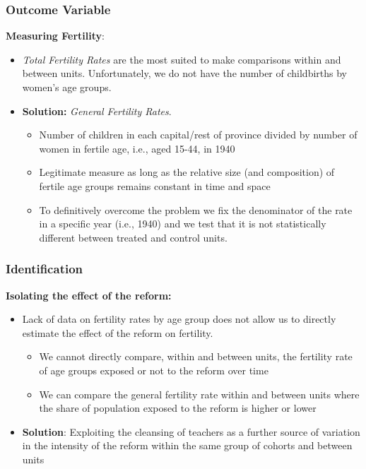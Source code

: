 \documentclass[aspectratio=169]{beamer}
\begin{document}
 





\begin{frame}[label=empirical]
\frametitle{Outcome Variable}

\textbf{Measuring Fertility}:
\medskip
\begin{itemize}
    \item \textit{Total Fertility Rates} are the most suited to make comparisons within and between units. Unfortunately, we do not have the number of childbirths by women's age groups. 
    \medskip\pause
    \item \textbf{Solution:} \textit{General Fertility Rates}. 
    \begin{itemize}

\medskip 
    \item Number of children in each capital/rest of province divided by number of women in fertile age, i.e., aged 15-44, in 1940 
    \medskip\pause
    \item Legitimate measure as long as the relative size (and composition) of fertile age groups remains constant in time and space \hyperlink{stability_age}{}
    \medskip\pause
    \item To definitively overcome the problem we fix the denominator of the rate in a specific year (i.e., 1940) and we test that it is not statistically different between treated and control units.
    \end{itemize}

    \medskip
    
\end{itemize}

\end{frame}

\begin{frame}[label=empirical2]
\frametitle{Identification}


\textbf{Isolating the effect of the reform:}
\medskip
\begin{itemize}
\item Lack of data on fertility rates by age group does not allow us to directly estimate the effect of the reform on fertility. 
\begin{itemize}
\pause
\medskip
\item We cannot directly compare, within and between units, the fertility rate of age groups exposed or not to the reform over time 
\medskip\pause
\item We can compare the general fertility rate within and between units where the share of population exposed to the reform is higher or lower
\end{itemize}
\medskip \pause
\item \textbf{Solution}: Exploiting the cleansing of teachers as a further source of variation in the intensity of the reform within the same group of cohorts and between units 
\end{itemize}
\end{frame}
\end{document}
